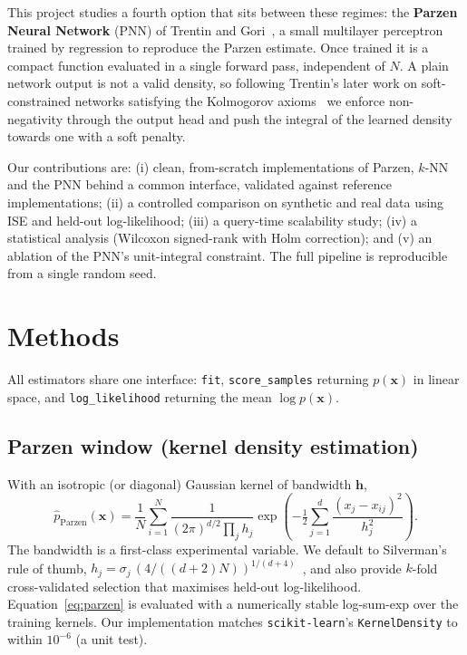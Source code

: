 \documentclass[11pt,a4paper]{article}
\begin{document}
This project studies a fourth option that sits between these regimes: the
\textbf{Parzen Neural Network} (PNN) of Trentin and Gori~\cite{trentin2001parzen},
a small multilayer perceptron trained by regression to reproduce the Parzen
estimate. Once trained it is a compact function evaluated in a single forward
pass, independent of $N$. A plain network output is not a valid density, so
following Trentin's later work on soft-constrained networks satisfying the
Kolmogorov axioms~\cite{trentin2018soft} we enforce non-negativity through the
output head and push the integral of the learned density towards one with a soft
penalty.

Our contributions are: (i) clean, from-scratch implementations of Parzen, $k$-NN
and the PNN behind a common interface, validated against reference
implementations; (ii) a controlled comparison on synthetic and real data using
ISE and held-out log-likelihood; (iii) a query-time scalability study; (iv) a
statistical analysis (Wilcoxon signed-rank with Holm correction); and (v) an
ablation of the PNN's unit-integral constraint. The full pipeline is
reproducible from a single random seed.

\section{Methods}
All estimators share one interface: \texttt{fit}, \texttt{score\_samples}
returning $p(\mathbf{x})$ in linear space, and \texttt{log\_likelihood}
returning the mean $\log p(\mathbf{x})$.

\subsection{Parzen window (kernel density estimation)}
With an isotropic (or diagonal) Gaussian kernel of bandwidth $\mathbf{h}$,
\begin{equation}
\hat p_{\text{Parzen}}(\mathbf{x})
= \frac{1}{N}\sum_{i=1}^{N}
\frac{1}{(2\pi)^{d/2}\prod_j h_j}
\exp\!\left(-\tfrac12 \sum_{j=1}^{d}\frac{(x_j - x_{ij})^2}{h_j^2}\right).
\label{eq:parzen}
\end{equation}
The bandwidth is a first-class experimental variable. We default to Silverman's
rule of thumb, $h_j = \sigma_j\,(4/((d+2)N))^{1/(d+4)}$~\cite{silverman1986}, and
also provide $k$-fold cross-validated selection that maximises held-out
log-likelihood. Equation~\eqref{eq:parzen} is evaluated with a numerically
stable log-sum-exp over the training kernels. Our implementation matches
\texttt{scikit-learn}'s \texttt{KernelDensity} to within $10^{-6}$ (a unit test).
\end{document}
